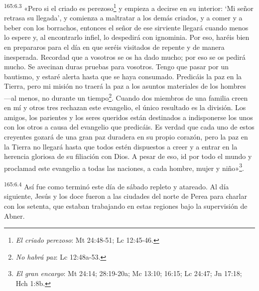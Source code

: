 \par
\textsuperscript{165:6.3} «Pero si el criado es perezoso\footnote{\textit{El criado perezoso}: Mt 24:48-51; Lc 12:45-46.} y empieza a decirse en su interior: `Mi señor retrasa su llegada', y comienza a maltratar a los demás criados, y a comer y a beber con los borrachos, entonces el señor de ese sirviente llegará cuando menos lo espere y, al encontrarlo infiel, lo despedirá con ignominia. Por eso, haréis bien en prepararos para el día en que seréis visitados de repente y de manera inesperada. Recordad que a vosotros se os ha dado mucho; por eso se os pedirá mucho. Se avecinan duras pruebas para vosotros. Tengo que pasar por un bautismo, y estaré alerta hasta que se haya consumado. Predicáis la paz en la Tierra, pero mi misión no traerá la paz a los asuntos materiales de los hombres ---al menos, no durante un tiempo\footnote{\textit{No habrá paz}: Lc 12:48a-53.}. Cuando dos miembros de una familia creen en mí y otros tres rechazan este evangelio, el único resultado es la división. Los amigos, los parientes y los seres queridos están destinados a indisponerse los unos con los otros a causa del evangelio que predicáis. Es verdad que cada uno de estos creyentes gozará de una gran paz duradera en su propio corazón, pero la paz en la Tierra no llegará hasta que todos estén dispuestos a creer y a entrar en la herencia gloriosa de su filiación con Dios. A pesar de eso, id por todo el mundo y proclamad este evangelio a todas las naciones, a cada hombre, mujer y niño»\footnote{\textit{El gran encargo}: Mt 24:14; 28:19-20a; Mc 13:10; 16:15; Lc 24:47; Jn 17:18; Hch 1:8b.}.

\par
\textsuperscript{165:6.4} Así fue como terminó este día de sábado repleto y atareado. Al día siguiente, Jesús y los doce fueron a las ciudades del norte de Perea para charlar con los setenta, que estaban trabajando en estas regiones bajo la supervisión de Abner.